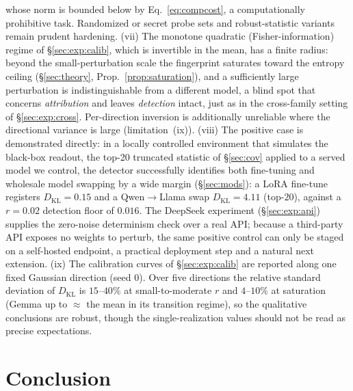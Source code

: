 \documentclass[11pt]{article}
\theoremstyle{definition}
\begin{document}
whose norm is bounded below by Eq.~\eqref{eq:compcost}, a computationally
prohibitive task. Randomized or secret probe sets and robust-statistic
variants remain prudent hardening. (vii) The monotone quadratic (Fisher-information) regime of
\S\ref{sec:exp:calib}, which is invertible in the mean, has a finite radius:
beyond the small-perturbation scale the fingerprint saturates toward the entropy
ceiling (\S\ref{sec:theory}, Prop.~\ref{prop:saturation}), and a sufficiently
large perturbation is indistinguishable from a different model, a blind spot
that concerns \emph{attribution} and leaves \emph{detection} intact, just as in the cross-family setting
of \S\ref{sec:exp:cross}. Per-direction
inversion is additionally unreliable where the directional variance is large
(limitation~(ix)).
(viii) The positive case is demonstrated directly: in a locally controlled
environment that simulates the black-box readout, the top-20 truncated
statistic of \S\ref{sec:cov} applied to a served model we control, the detector
successfully identifies both fine-tuning and wholesale model swapping by a wide
margin (\S\ref{sec:mods}): a LoRA fine-tune registers $D_{\mathrm{KL}}=0.15$ and
a Qwen$\to$Llama swap $D_{\mathrm{KL}}=4.11$ (top-$20$), against a $r{=}0.02$
detection floor of $0.016$. The DeepSeek experiment (\S\ref{sec:exp:api})
supplies the zero-noise determinism check over a real API; because a third-party
API exposes no weights to perturb, the same positive control can only be staged
on a self-hosted endpoint, a practical deployment step and a natural next
extension. (ix) The calibration curves of \S\ref{sec:exp:calib} are reported along one
fixed Gaussian direction (seed $0$). Over five directions the relative standard
deviation of $D_{\mathrm{KL}}$ is $15$--$40\%$ at small-to-moderate $r$ and
$4$--$10\%$ at saturation (Gemma up to $\approx$ the mean in its transition
regime), so the qualitative conclusions are robust, though the
single-realization values should not be read as precise expectations.

\section{Conclusion}
\label{sec:concl}
\end{document}

